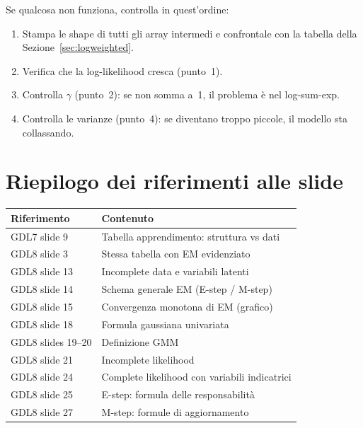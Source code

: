 \documentclass[11pt,a4paper]{article}
\begin{document}
\begin{tipbox}
Se qualcosa non funziona, controlla in quest'ordine:
\begin{enumerate}[nosep]
  \item Stampa le shape di tutti gli array intermedi e confrontale
        con la tabella della Sezione~\ref{sec:logweighted}.
  \item Verifica che la log-likelihood cresca (punto~1).
  \item Controlla $\gamma$ (punto~2): se non somma a~1, il problema
        è nel log-sum-exp.
  \item Controlla le varianze (punto~4): se diventano troppo piccole,
        il modello sta collassando.
\end{enumerate}
\end{tipbox}

\newpage
\section*{Riepilogo dei riferimenti alle slide}

\begin{center}
\renewcommand{\arraystretch}{1.3}
\begin{tabular}{ll}
\toprule
\textbf{Riferimento} & \textbf{Contenuto} \\
\midrule
GDL7 slide 9 & Tabella apprendimento: struttura vs dati \\
GDL8 slide 3 & Stessa tabella con EM evidenziato \\
GDL8 slide 13 & Incomplete data e variabili latenti \\
GDL8 slide 14 & Schema generale EM (E-step / M-step) \\
GDL8 slide 15 & Convergenza monotona di EM (grafico) \\
GDL8 slide 18 & Formula gaussiana univariata \\
GDL8 slides 19--20 & Definizione GMM \\
GDL8 slide 21 & Incomplete likelihood \\
GDL8 slide 24 & Complete likelihood con variabili indicatrici \\
GDL8 slide 25 & E-step: formula delle responsabilità \\
GDL8 slide 27 & M-step: formule di aggiornamento \\
\bottomrule
\end{tabular}
\end{center}
\end{document}
